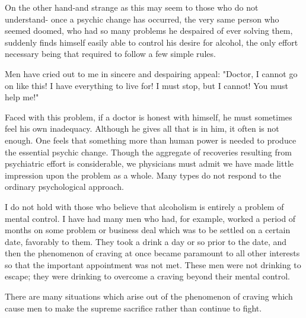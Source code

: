 \begin{biblechapter}
\verse On the other hand-and strange as this may seem to those who do not understand-
    once a psychic change has occurred, 
    the very same person who seemed doomed, 
    who had so many problems he despaired of ever solving them, 
    suddenly finds himself easily able to control his desire for alcohol, 
    the only effort necessary being that required to follow a few simple rules.

\verse Men have cried out to me in sincere and despairing appeal: 
\verse "Doctor, I cannot go on like this! 
    I have everything to live for! 
    I must stop, but I cannot! 
    You must help me!"

\verse Faced with this problem, 
    if a doctor is honest with himself, 
    he must sometimes feel his own inadequacy. 
\verse Although he gives all that is in him, it often is not enough. 
\verse One feels that something more than human power is needed to produce the essential psychic change. 
\verse Though the aggregate of recoveries resulting from psychiatric effort is considerable, 
    we physicians must admit we have made little impression upon the problem as a whole. 
\verse Many types do not respond to the ordinary psychological approach.
\end{biblechapter}


\begin{biblechapter}
    I do not hold with those who believe that alcoholism is entirely a problem of mental control. 
\verse I have had many men who had, for example, 
    worked a period of months on some problem or business deal which was to be settled on a certain date, 
    favorably to them. 
\verse They took a drink a day or so prior to the date, 
    and then the phenomenon of craving at once became paramount to all other interests 
    so that the important appointment was not met. 
\verse These men were not drinking to escape; 
    they were drinking to overcome a craving beyond their mental control.

\verse There are many situations which arise out of the phenomenon of craving 
    which cause men to make the supreme sacrifice rather than continue to fight.
\end{biblechapter}


